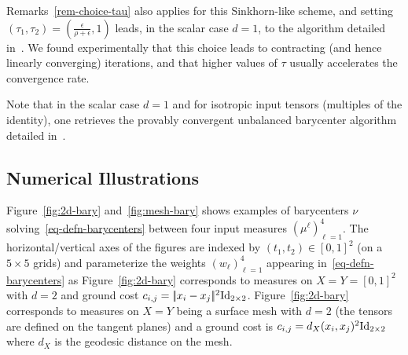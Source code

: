 \begin{rem}
Remarks~\ref{rem-choice-tau} also applies for this Sinkhorn-like scheme, and setting $(\tau_1,\tau_2)=(\tfrac{\epsilon}{\rho+\epsilon},1)$ leads, in the scalar case $d=1$, to the algorithm detailed in~\cite{2016-chizat-sinkhorn}. We found experimentally that this choice leads to contracting (and hence linearly converging) iterations, and that higher values of $\tau$ usually accelerates the convergence rate. 
\end{rem}

\begin{rem}
Note that in the scalar case $d=1$ and for isotropic input tensors (multiples of the identity), one retrieves the provably convergent unbalanced barycenter algorithm detailed in~\cite{2016-chizat-sinkhorn}.
\end{rem}



\subsection{Numerical Illustrations}

Figure~\ref{fig:2d-bary} and~\ref{fig:mesh-bary} shows examples of barycenters $\nu$ solving~\eqref{eq-defn-barycenters} between four input measures $(\mu^\ell)_{\ell=1}^4$. The horizontal/vertical axes of the figures are indexed by $(t_1,t_2) \in [0,1]^2$ (on a $5 \times 5$ grids) and parameterize the weights $(w_\ell)_{\ell=1}^4$ appearing in~\eqref{eq-defn-barycenters} as
Figure~\ref{fig:2d-bary} corresponds to measures on $X=Y=[0,1]^2$ with $d=2$ and ground cost $c_{i,j}=|\!| x_i-x_j |\!|^2\mathrm{Id}_{2 \times 2}$.
Figure~\ref{fig:2d-bary} corresponds to measures on $X=Y$ being a surface mesh with $d=2$ (the tensors are defined on the tangent planes) and a ground cost is $c_{i,j}=d_X(x_i,x_j)^2\mathrm{Id}_{2 \times 2}$ where $d_X$ is the geodesic distance on the mesh.




